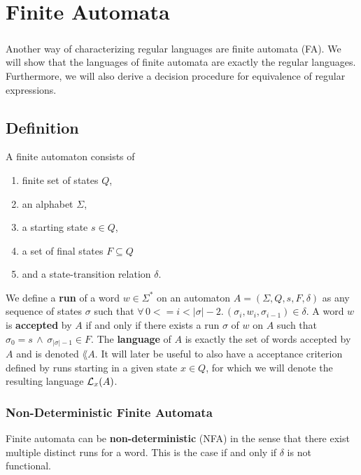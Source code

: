 
\chapter{Finite Automata}
\paragraph{} 
Another way of characterizing regular languages are finite automata (FA). 
We will show that the languages of finite automata are exactly the regular languages. 
Furthermore, we will also derive a decision procedure for equivalence of regular expressions.

\section{Definition}
A finite automaton consists of
\begin{enumerate}
    \item
        finite set of states $Q$, 
    \item 
        an alphabet $\Sigma$, 
    \item 
        a starting state $s \in Q$, 
    \item 
        a set of final states $F \subseteq Q$ 
    \item 
        and a state-transition relation $\delta$. \cite{DBLP:books/daglib/0011126}
\end{enumerate}

We define a \textbf{run} of a word $w \in \Sigma^*$ on an automaton $A = (\Sigma, Q, s, F, \delta)$ as any sequence of states $\sigma$ such that 
$\forall \, 0 <= i < \vert\sigma\vert-2. \, (\sigma_i, w_i, \sigma_{i-1}) \in \delta$.
A word $w$ is \textbf{accepted} by $A$ if and only if there exists a run $\sigma$ of $w$ on $A$ such that $\sigma_0 = s \, \wedge \, \sigma_{\vert\sigma\vert-1} \in F$.
The \textbf{language} of $A$ is exactly the set of words accepted by $A$ and is denoted $\lang{A}$. 
It will later be useful to also have a acceptance criterion defined by runs starting in a given state $x \in Q$, for which we will denote the resulting language $\mathcal{L}_{x}(A)$.

\subsection{Non-Deterministic Finite Automata}
Finite automata can be \textbf{non-deterministic} (NFA) in the sense that there exist multiple distinct runs for a word. 
This is the case if and only if $\delta$ is not functional.

